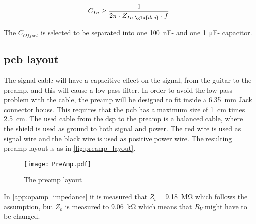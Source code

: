 \begin{equation}\label{eq:preamp_cout}
        C_{In} \geq  \frac{1}{2 \pi \cdot Z_{In,\gls{dsp}} \cdot f}
        \addunit{\si{\farad}}
    \end{equation}

    \startexplain
    \stopexplain
    
The $C_{Offset}$ is selected to be separated into one \SI{100}{\nano\farad}- and one \SI{1}{\micro\farad}- capacitor.
 
\subsection{\gls{pcb} layout} 
The signal cable will have a capacitive effect on the signal, from the guitar to the \gls{preamp}, and this will cause a low pass filter. In order to avoid the low pass problem with the cable, the \gls{preamp} will be designed to fit inside a \SI{6.35}{\milli\meter} Jack connector house. This requires that the \gls{pcb} has a maximum size of  \SI{1}{\centi\meter} times \SI{2.5}{\centi\meter}. The used cable from the \gls{dsp} to the \gls{preamp} is a balanced cable, where the shield is used as ground to both signal and power. The red wire is used as signal wire and the black wire is used as positive power wire. The resulting \gls{preamp} layout is as in \autoref{fig:preamp_layout}.
 
 \begin{figure}[h]
	\centering
		\texttt{[image: PreAmp.pdf]}
		\caption{The \gls{preamp} layout}
		\label{fig:preamp_layout}
\end{figure}

In \autoref{app:opamp_impedance} it is measured that $Z_i =$\SI{9.18}{\mega\ohm} which follows the assumption, but $Z_o$ is measured to \SI{9.06}{\kilo\ohm} which means that $R_V$ might have to be changed. 
 
